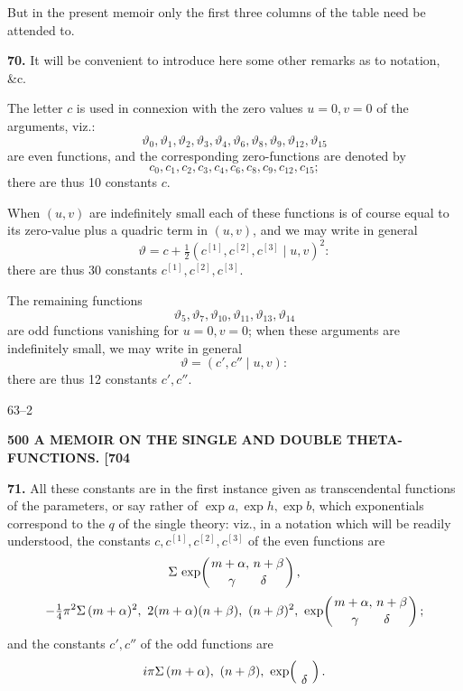\documentclass[11pt]{article}
\begin{document}
But in the present memoir only the first three columns of the table need be attended to.

\medskip
\textbf{70.} It will be convenient to introduce here some other remarks as to notation, \&c.

The letter $c$ is used in connexion with the zero values $u=0, v=0$ of the arguments, viz.:
\[
\vartheta_0, \vartheta_1, \vartheta_2, \vartheta_3, \vartheta_4, \vartheta_6, \vartheta_8, \vartheta_9, \vartheta_{12}, \vartheta_{15}
\]
are even functions, and the corresponding zero-functions are denoted by
\[
c_0, c_1, c_2, c_3, c_4, c_6, c_8, c_9, c_{12}, c_{15};
\]
there are thus 10 constants $c$.

When $(u,v)$ are indefinitely small each of these functions is of course equal to its zero-value plus a quadric term in $(u,v)$, and we may write in general
\[
\vartheta = c + \tfrac{1}{2}(c^{[1]},c^{[2]},c^{[3]} \!\!\mid\!\! u, v)^2:
\]
there are thus 30 constants $c^{[1]}, c^{[2]}, c^{[3]}$.

The remaining functions
\[
\vartheta_5, \vartheta_7, \vartheta_{10}, \vartheta_{11}, \vartheta_{13}, \vartheta_{14}
\]
are odd functions vanishing for $u=0, v=0$; when these arguments are indefinitely small, we may write in general
\[
\vartheta = (c', c''\!\!\mid\!\! u, v):
\]
there are thus 12 constants $c', c''$.

\hfill 63--2

\bigskip
\noindent\textbf{500 \hfill A MEMOIR ON THE SINGLE AND DOUBLE THETA-FUNCTIONS. \hfill [704}

\medskip
\textbf{71.} All these constants are in the first instance given as transcendental functions of the parameters, or say rather of $\exp a, \exp h, \exp b$, which exponentials correspond to the $q$ of the single theory: viz., in a notation which will be readily understood, the constants $c, c^{[1]}, c^{[2]}, c^{[3]}$ of the even functions are
\[
\Sigma\,\exp\!\left(\genfrac{}{}{0pt}{}{m+\alpha,\,n+\beta}{\gamma\quad\quad\delta}\right),
\]
\[
-\tfrac{1}{4}\pi^2\Sigma\,(m+\alpha)^2,\ 2(m+\alpha)(n+\beta),\ (n+\beta)^2,\ \exp\!\left(\genfrac{}{}{0pt}{}{m+\alpha,\,n+\beta}{\gamma\quad\quad\delta}\right);
\]
and the constants $c', c''$ of the odd functions are
\[
i\pi\Sigma\,(m+\alpha),\ (n+\beta),\ \exp\!\left(\genfrac{}{}{0pt}{}{\quad}{\delta}\right).
\]
\end{document}
